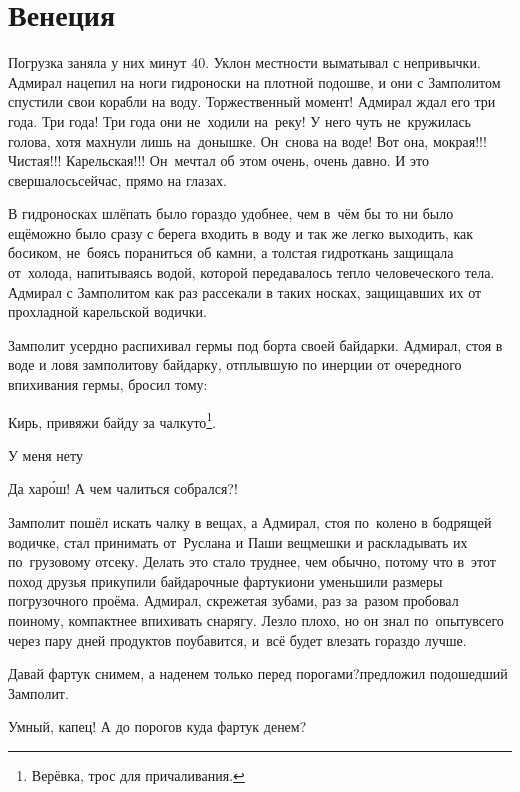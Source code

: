 \chapter{Венеция}
\vepsianrose

Погрузка заняла у них минут 40. Уклон местности выматывал с непривычки. Адмирал нацепил на ноги гидроноски на плотной подошве, и они с Замполитом спустили свои корабли на воду. Торжественный момент! Адмирал ждал его три года. Три года! Три года они не~ходили на~реку! У него чуть не~кружилась голова, хотя махнули лишь на~донышке. Он~снова на воде! Вот она, мокрая!!! Чистая!!! Карельская!!! Он~мечтал об этом очень, очень давно. И это свершалось\mdash сейчас, прямо на глазах.

В гидроносках шлёпать было гораздо удобнее, чем в~чём бы то ни было ещё\mdash можно было сразу с берега входить в воду и так же легко выходить, как босиком, не~боясь пораниться об камни, а толстая гидроткань защищала от~холода, напитываясь водой, которой передавалось тепло человеческого тела. Адмирал с Замполитом как раз рассекали в таких носках, защищавших их от прохладной карельской водички.

Замполит усердно распихивал гермы под борта своей байдарки. Адмирал, стоя в воде и ловя замполитову байдарку, отплывшую по инерции от очередного впихивания гермы, бросил тому:

\renewcommand*{\thefootnote}{\fnsymbol{footnote}}
\setcounter{footnote}{0}
\diagdash Кирь, привяжи байду за чалку\sdash то\footnote{Верёвка, трос для причаливания.}.

\diagdash У меня нету\myldots{}

\diagdash Да хар\'{о}ш! А чем чалиться собрался?!

Замполит пошёл искать чалку в вещах, а Адмирал, стоя по~колено в бодрящей водичке, стал принимать от~Руслана и Паши вещмешки и раскладывать их по~грузовому отсеку. Делать это стало труднее, чем обычно, потому что в~этот поход друзья прикупили байдарочные фартуки\mdash они уменьшили размеры погрузочного проёма. Адмирал, скрежетая зубами, раз за~разом пробовал по\sdash иному, компактнее впихивать снарягу. Лезло плохо, но он знал по~опыту\mdash всего через пару дней продуктов поубавится, и~всё будет влезать гораздо лучше.

\diagdash Давай фартук снимем, а наденем только перед порогами?\mdash предложил подошедший Замполит. 

\diagdash Умный, капец! А до порогов куда фартук денем? 

